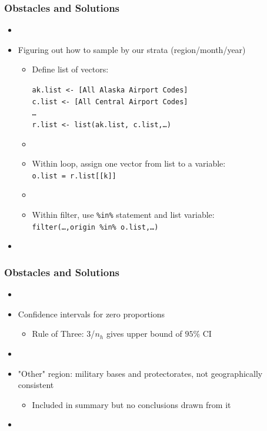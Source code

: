 \documentclass{beamer}
\begin{document}
\begin{frame}
\frametitle{Obstacles and Solutions}
\begin{itemize}

\item[]

\item Figuring out how to sample by our strata (region/month/year)


\begin{itemize}
\item Define list of vectors:


\texttt{ak.list <- [All Alaska Airport Codes] }\\
\texttt{c.list  <- [All Central Airport Codes]}\\
\texttt{\ldots}\\
\texttt{r.list <- list(ak.list, c.list,\ldots)}
\item[]

\item Within loop, assign one vector from list to a variable:\\
\texttt{o.list = r.list[[k]]}\\

\item[]
\item Within filter, use \texttt{\%in\%} statement and list variable:\\
\texttt{filter(\ldots,origin \%in\% o.list,\ldots)}\\


\end{itemize}



\item[]

\end{itemize}
\end{frame}


\begin{frame}
\frametitle{Obstacles and Solutions}
\begin{itemize}

\item[]

\item Confidence intervals for zero proportions
\begin{itemize}
\item Rule of Three: 3/$n_h$ gives upper bound of $95\%$ CI
\end{itemize}

\item[]

\item "Other" region: military bases and protectorates, not geographically consistent
\begin{itemize}
\item Included in summary but no conclusions drawn from it
\end{itemize}

\item[]

\end{itemize}
\end{frame}
\end{document}
